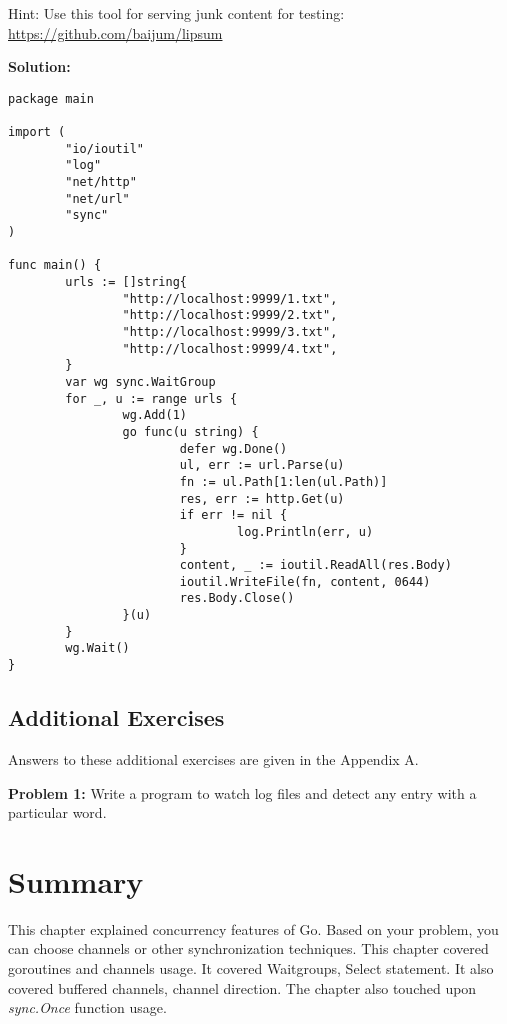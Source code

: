 \noindent
Hint: Use this tool for serving junk content for testing:
\url{https://github.com/baijum/lipsum}

\textbf{Solution:}

\begin{lstlisting}[numbers=none]
package main

import (
        "io/ioutil"
        "log"
        "net/http"
        "net/url"
        "sync"
)

func main() {
        urls := []string{
                "http://localhost:9999/1.txt",
                "http://localhost:9999/2.txt",
                "http://localhost:9999/3.txt",
                "http://localhost:9999/4.txt",
        }
        var wg sync.WaitGroup
        for _, u := range urls {
                wg.Add(1)
                go func(u string) {
                        defer wg.Done()
                        ul, err := url.Parse(u)
                        fn := ul.Path[1:len(ul.Path)]
                        res, err := http.Get(u)
                        if err != nil {
                                log.Println(err, u)
                        }
                        content, _ := ioutil.ReadAll(res.Body)
                        ioutil.WriteFile(fn, content, 0644)
                        res.Body.Close()
                }(u)
        }
        wg.Wait()
}
\end{lstlisting}


\subsection{Additional Exercises}

Answers to these additional exercises are given in the Appendix A.

\textbf{Problem 1:} Write a program to watch log files and detect any entry with a particular word.

\section*{Summary}

This chapter explained concurrency features of Go.  Based on your
problem, you can choose channels or other synchronization techniques.
This chapter covered goroutines and channels usage.  It covered
Waitgroups, Select statement.  It also covered buffered channels,
channel direction.  The chapter also touched upon \textit{sync.Once}
function usage.
